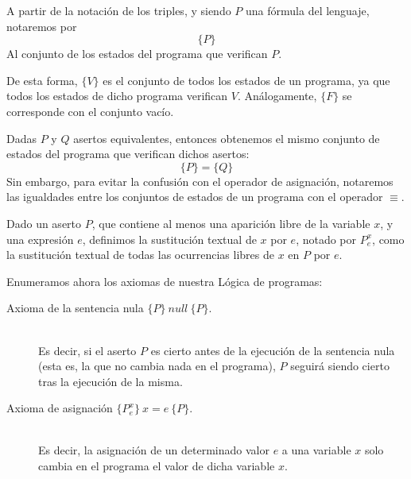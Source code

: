 \begin{notacion}
    A partir de la notación de los triples, y siendo $P$ una fórmula del lenguaje, notaremos por
    \begin{equation*}
        \{P\}
    \end{equation*}
    Al conjunto de los estados del programa que verifican $P$.
\end{notacion}

De esta forma, $\{V\}$ es el conjunto de todos los estados de un programa, ya que todos los estados de dicho programa verifican $V$. Análogamente, $\{F\}$ se corresponde con el conjunto vacío.

\begin{notacion}
    Dadas $P$ y $Q$ asertos equivalentes, entonces obtenemos el mismo conjunto de estados del programa que verifican dichos asertos:
    \begin{equation*}
        \{P\} = \{Q\}
    \end{equation*}
    Sin embargo, para evitar la confusión con el operador de asignación, notaremos las igualdades entre los conjuntos de estados de un programa con el operador $\equiv$.
\end{notacion}

\begin{definicion}
    Dado un aserto $P$, que contiene al menos una aparición libre de la variable $x$, y una expresión $e$, definimos la sustitución textual de $x$ por $e$, notado por $P_e^x$, como la sustitución textual de todas las ocurrencias libres de $x$ en $P$ por $e$.
\end{definicion}

Enumeramos ahora los axiomas de nuestra Lógica de programas:
\begin{description}
    \item [Axioma de la sentencia nula $\{P\}\ null\ \{P\}$.]~\\
        Es decir, si el aserto $P$ es cierto antes de la ejecución de la sentencia nula (esta es, la que no cambia nada en el programa), $P$ seguirá siendo cierto tras la ejecución de la misma.
    \item [Axioma de asignación $\{P_e^x\}\ x=e\ \{P\}$.]~\\
        Es decir, la asignación de un determinado valor $e$ a una variable $x$ solo cambia en el programa el valor de dicha variable $x$.
\end{description}

